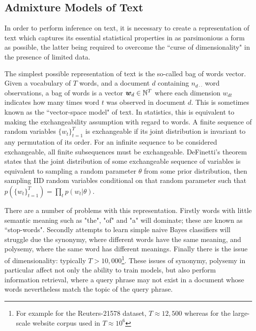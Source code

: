 

\subsection{Admixture Models of Text}
In order to perform inference on text, it is necessary to create a representation of text which captures its essential statistical properties in as parsimonious a form as possible, the latter being required to overcome the ``curse of dimensionality"\cite{Bishop2006} in the presence of limited data.

The simplest possible representation of text is the so-called bag of words vector. Given a vocabulary of $T$ words, and a document $d$ containing $n_{d\cdot\cdot}$ word observations, a bag of words is a vector $\bm w_d \in { \mathbb{N}^{T} }$ where each dimension $w_{dt}$ indicates how many times word $t$ was observed in document $d$. This is sometimes known as the ``vector-space model"\cite{Jst2004} of text. In statistics, this is equivalent to making the exchangeability assumption with regard to words. A finite sequence of random variables $\{w_t\}_{t=1}^{T}$ is exchangeable if its joint distribution is invariant to any permutation of its order. For an infinite sequence to be considered exchangeable, all finite subsequences must be exchangeable. DeFinetti's theorem\cite{Hewitt1955} states that the joint distribution of some exchangeable sequence of variables is equivalent to sampling a random parameter $\theta$ from some prior distribution, then sampling IID random variables conditional on that random parameter such that $p\left(\{w_t\}_{t=1}^{T}\right) = \prod_t p(w_t | \theta)$.

There are a number of problems with this representation. Firstly words with little semantic meaning such as "the", "of" and "a" will dominate; these are known as ``stop-words". Secondly attempts to learn simple naive Bayes classifiers\cite{Nigam2000} will struggle due the synonymy, where different words have the same meaning, and polysemy, where the same word has different meanings. Finally there is the issue of dimensionality: typically $T > 10,000$\footnote{For example for the Reuters-21578 dataset, $T\approx 12,500$ whereas for the large-scale website corpus used in\cite{Smola2010} $T \approx 10^6$}. These issues of synonymy, polysemy in particular affect not only the ability to train models, but also perform information retrieval, where a query phrase may not exist in a document whose words nevertheless match the topic of the query phrase.

